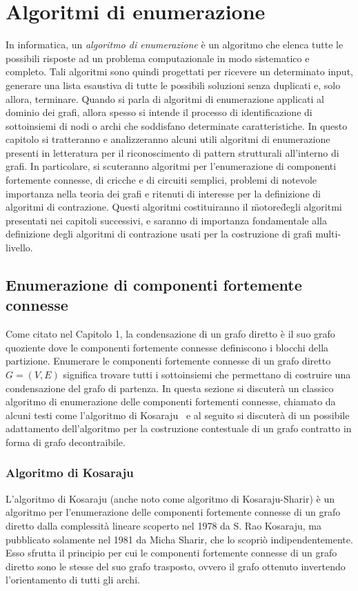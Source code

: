 \chapter{Algoritmi di enumerazione}

In informatica, un \textit{algoritmo di enumerazione} \`e un algoritmo che elenca tutte le possibili risposte ad un
problema computazionale in modo sistematico e completo. Tali algoritmi sono quindi progettati per ricevere un
determinato input, generare una lista esaustiva di tutte le possibili soluzioni senza duplicati e, solo allora,
terminare.
Quando si parla di algoritmi di enumerazione applicati al dominio dei grafi, allora spesso si intende il processo di
identificazione di sottoinsiemi di nodi o archi che soddisfano determinate caratteristiche.
In questo capitolo si tratteranno e analizzeranno alcuni utili algoritmi di enumerazione presenti in letteratura per
il riconoscimento di pattern strutturali all'interno di grafi. In particolare, si scuteranno algoritmi per l'enumerazione
di componenti fortemente connesse, di cricche e di circuiti semplici, problemi di notevole importanza nella teoria dei
grafi e ritenuti di interesse per la definizione di algoritmi di contrazione.
Questi algoritmi costituiranno il \"motore\" degli algoritmi presentati nei capitoli successivi, e saranno di
importanza fondamentale alla definizione degli algoritmi di contrazione usati per la costruzione di grafi multi-livello.

\section{Enumerazione di componenti fortemente connesse}\label{subsec:enumerazione-di-componenti-fortemente-connesse}
Come citato nel Capitolo 1, la condensazione di un grafo diretto \`e il suo grafo quoziente dove le componenti
fortemente connesse definiscono i blocchi della partizione.
Enumerare le componenti fortemente connesse di un grafo diretto $G = (V, E)$ significa trovare tutti i sottoinsiemi
che permettano di costruire una condensazione del grafo di partenza.
In questa sezione si discuter\`a un classico algoritmo di enumerazione delle componenti fortementi connesse, chiamato
da alcuni testi come l'algoritmo di Kosaraju~\cite{SHARIR198167} e al seguito si discuter\`a di un possibile adattamento
dell'algoritmo per la costruzione contestuale di un grafo contratto in forma di grafo decontraibile.

\subsection{Algoritmo di Kosaraju}\label{subsec:algoritmo-di-kosaraju}
L'algoritmo di Kosaraju (anche noto come algoritmo di Kosaraju-Sharir) \`e un algoritmo per l'enumerazione
delle componenti fortemente connesse di un grafo diretto dalla complessit\`a lineare scoperto nel 1978 da S. Rao
Kosaraju, ma pubblicato solamente nel 1981 da Micha Sharir, che lo scopri\`o indipendentemente.
Esso sfrutta il principio per cui le componenti fortemente connesse di un grafo diretto sono le stesse del suo grafo
trasposto, ovvero il grafo ottenuto invertendo l'orientamento di tutti gli archi.

